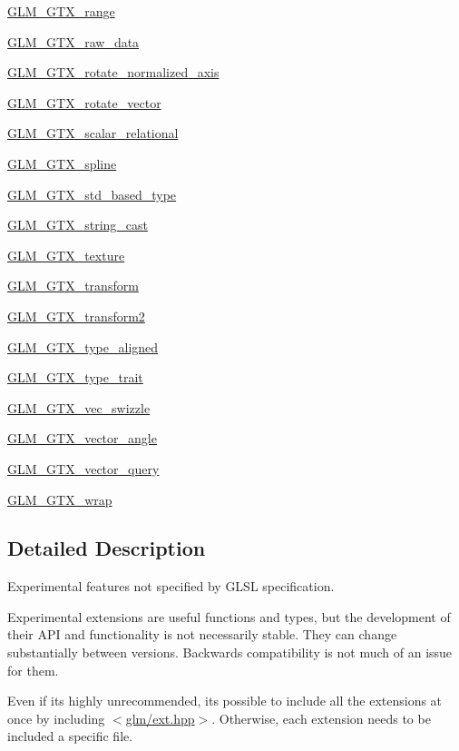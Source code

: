 \begin{DoxyCompactItemize}
\hyperlink{group__gtx__range}{G\+L\+M\+\_\+\+G\+T\+X\+\_\+range}
\item 
\hyperlink{group__gtx__raw__data}{G\+L\+M\+\_\+\+G\+T\+X\+\_\+raw\+\_\+data}
\item 
\hyperlink{group__gtx__rotate__normalized__axis}{G\+L\+M\+\_\+\+G\+T\+X\+\_\+rotate\+\_\+normalized\+\_\+axis}
\item 
\hyperlink{group__gtx__rotate__vector}{G\+L\+M\+\_\+\+G\+T\+X\+\_\+rotate\+\_\+vector}
\item 
\hyperlink{group__gtx__scalar__relational}{G\+L\+M\+\_\+\+G\+T\+X\+\_\+scalar\+\_\+relational}
\item 
\hyperlink{group__gtx__spline}{G\+L\+M\+\_\+\+G\+T\+X\+\_\+spline}
\item 
\hyperlink{group__gtx__std__based__type}{G\+L\+M\+\_\+\+G\+T\+X\+\_\+std\+\_\+based\+\_\+type}
\item 
\hyperlink{group__gtx__string__cast}{G\+L\+M\+\_\+\+G\+T\+X\+\_\+string\+\_\+cast}
\item 
\hyperlink{group__gtx__texture}{G\+L\+M\+\_\+\+G\+T\+X\+\_\+texture}
\item 
\hyperlink{group__gtx__transform}{G\+L\+M\+\_\+\+G\+T\+X\+\_\+transform}
\item 
\hyperlink{group__gtx__transform2}{G\+L\+M\+\_\+\+G\+T\+X\+\_\+transform2}
\item 
\hyperlink{group__gtx__type__aligned}{G\+L\+M\+\_\+\+G\+T\+X\+\_\+type\+\_\+aligned}
\item 
\hyperlink{group__gtx__type__trait}{G\+L\+M\+\_\+\+G\+T\+X\+\_\+type\+\_\+trait}
\item 
\hyperlink{group__gtx__vec__swizzle}{G\+L\+M\+\_\+\+G\+T\+X\+\_\+vec\+\_\+swizzle}
\item 
\hyperlink{group__gtx__vector__angle}{G\+L\+M\+\_\+\+G\+T\+X\+\_\+vector\+\_\+angle}
\item 
\hyperlink{group__gtx__vector__query}{G\+L\+M\+\_\+\+G\+T\+X\+\_\+vector\+\_\+query}
\item 
\hyperlink{group__gtx__wrap}{G\+L\+M\+\_\+\+G\+T\+X\+\_\+wrap}
\end{DoxyCompactItemize}


\subsection{Detailed Description}
Experimental features not specified by G\+L\+SL specification. 

Experimental extensions are useful functions and types, but the development of their A\+PI and functionality is not necessarily stable. They can change substantially between versions. Backwards compatibility is not much of an issue for them.

Even if it\textquotesingle{}s highly unrecommended, it\textquotesingle{}s possible to include all the extensions at once by including $<$\hyperlink{ext_8hpp}{glm/ext.\+hpp}$>$. Otherwise, each extension needs to be included a specific file. 